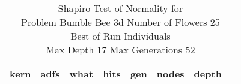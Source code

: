 \begin{table}[H]
\caption{Shapiro Test of Normality for \\ Problem  Bumble Bee 3d  Number of Flowers 25\\Best of Run Individuals \\ Max Depth 17 Max Generations 52\\}
\begin{center}
\scalebox{0.8} %
{
\begin{tabular}{lrrrrrrr}
\hline
kern & adfs & what & hits & gen & nodes & depth \\
\hline


\end{tabular}
}
\end{center}
\end{table}

